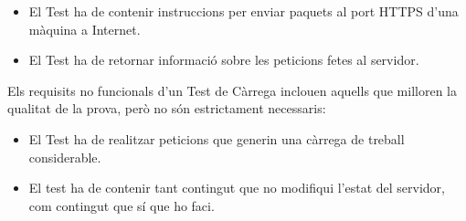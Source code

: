 \begin{itemize} 
    \item El Test ha de contenir instruccions per enviar paquets al port HTTPS d'una màquina a Internet.
    \item El Test ha de retornar informació sobre les peticions fetes al servidor.
\end{itemize}

Els requisits no funcionals d'un Test de Càrrega inclouen aquells que milloren la qualitat de la prova, però no són estrictament necessaris:

\begin{itemize} 
    \item El Test ha de realitzar peticions que generin una càrrega de treball considerable. 
    \item El test ha de contenir tant contingut que no modifiqui l'estat del servidor, com contingut que sí que ho faci.
\end{itemize}